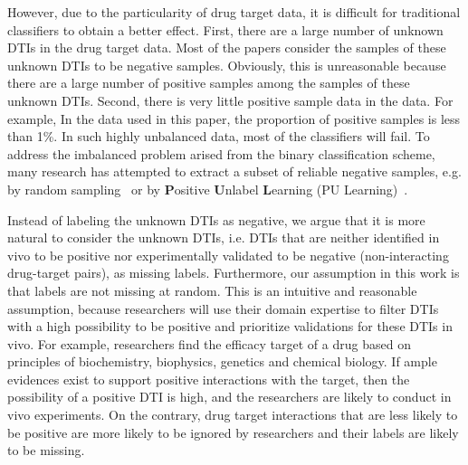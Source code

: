 \documentclass[journal]{IEEEtran}
\begin{document}
However, due to the particularity of drug target data, it is difficult for traditional classifiers to obtain a better effect. First, there are a large number of unknown DTIs in the drug target data. Most of the papers consider the samples of these unknown DTIs to be negative samples. Obviously, this is unreasonable because there are a large number of positive samples among the samples of these unknown DTIs. 
Second, there is very little positive sample data in the data. For example, In the data used in this paper, the proportion of positive samples is less than 1\%. In such highly unbalanced data, most of the classifiers will fail. To address the imbalanced problem arised from the binary classification scheme, many research has attempted to extract a subset of reliable negative samples, e.g. by random sampling~\cite{Luo2017Network} or by \textbf{P}ositive \textbf{U}nlabel \textbf{L}earning (PU Learning)~\cite{Peng2017Screening}.


Instead of labeling the unknown DTIs as negative, we argue that it is more natural to consider the unknown DTIs, i.e. DTIs that are neither identified in vivo to be positive nor experimentally validated to be negative (non-interacting drug-target pairs), as missing labels. Furthermore, our assumption in this work is that labels are not missing at random. This is an intuitive and reasonable assumption, because researchers will use their domain expertise to filter DTIs with a high possibility to be positive and prioritize validations for these DTIs in vivo. For example, researchers find the efficacy target of a drug based on principles of biochemistry, biophysics, genetics and chemical biology. If ample evidences exist to support positive interactions with the target, then the possibility of a positive DTI is high, and the researchers are likely to conduct in vivo experiments. On the contrary, drug target interactions that are less likely to be positive are more likely to be ignored by researchers and their labels are likely to be missing.
\end{document}
